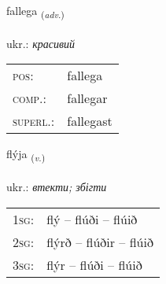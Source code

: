 \documentclass[frontgrid, backgrid]{flacards}\usepackage[]{graphicx}\usepackage[]{xcolor}
\begin{document}
\renewcommand{\flhead}{\vskip5pt \fboxsep=0pt {\small\bfseries\footnotesize Atviksorð | прислівник}}
\renewcommand{\fcfoot}{\vskip5pt \fboxsep=0pt \hspace{2pt}{\small\bfseries\footnotesize 3K}}

\renewcommand{\blhead}{\vskip5pt {\small\bfseries\footnotesize Atviksorð | прислівник }}
\renewcommand{\bcfoot}{\vskip5pt \hspace{2pt}{\small\bfseries\footnotesize 3K}}


{fallega \small{\textsubscript{(\textit{adv.})}} \\[1ex] %
\textphonetic{[fatlɛɣa]} \\
ukr.: \emph{красивий} \\  [2ex]
\renewcommand*{\arraystretch}{0.8}
\begin{tabular}{ll}
\textsc{pos}: & fallega \\ 
\textsc{comp.}: & fallegar \\ 
\textsc{superl.}: & fallegast \\
\end{tabular}
}

\renewcommand{\flhead}{\vskip5pt \fboxsep=0pt {\small\bfseries\footnotesize Sagnorð | дієслово}}
\renewcommand{\fcfoot}{\vskip5pt \fboxsep=0pt \hspace{2pt}{\small\bfseries\footnotesize 3K}}

\renewcommand{\blhead}{\vskip5pt {\small\bfseries\footnotesize Sagnorð | дієслово }}
\renewcommand{\bcfoot}{\vskip5pt \hspace{2pt}{\small\bfseries\footnotesize 3K}}


{flýja \small{\textsubscript{(\textit{v.})}} \\[1ex] %
\textphonetic{[fliːja]} \\
ukr.: \emph{втекти; збігти} \\  [2ex]
\renewcommand*{\arraystretch}{0.8}
\begin{tabular}{p{1cm}l}
\textsc{1sg}: & flý -- flúði -- flúið \\ 
\textsc{2sg}: & flýrð -- flúðir -- flúið \\ 
\textsc{3sg}: & flýr -- flúði -- flúið \\ 
\end{tabular}
}
\end{document}
